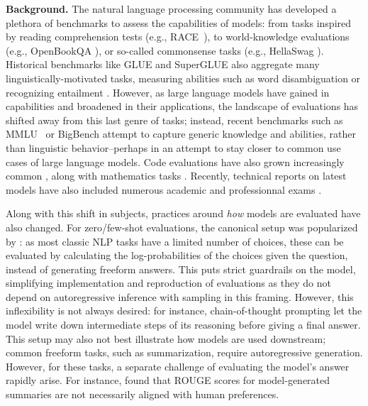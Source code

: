 \documentclass{article}
\begin{document}
\textbf{Background.} The natural language processing community has developed a plethora of benchmarks to assess the capabilities of models: from tasks inspired by reading comprehension tests (e.g., RACE~\citet{lai2017large}), to world-knowledge evaluations (e.g., OpenBookQA \citet{mihaylov2press2021train018openbookqa}), or so-called commonsense tasks (e.g., HellaSwag \citep{zellers2019hellaswag}). Historical benchmarks like GLUE and SuperGLUE also aggregate many linguistically-motivated tasks, measuring abilities such as word disambiguation or recognizing entailment \citep{wang2018glue, wang2019superglue}. However, as large language models have gained in capabilities and broadened in their applications, the landscape of evaluations has shifted away from this last genre of tasks; instead, recent benchmarks such as MMLU~\citep{hendrycks2020measuring} or BigBench \citep{srivastava2023beyond} attempt to capture generic knowledge and abilities, rather than linguistic behavior--perhaps in an attempt to stay closer to common use cases of large language models. Code evaluations have also grown increasingly common \citep{chen2021evaluating}, along with mathematics tasks \citep{cobbe2021training}. Recently, technical reports on latest models have also included numerous academic and professionnal exams \citep{gpt-4, palm-2}.

Along with this shift in subjects, practices around \textit{how} models are evaluated have also changed. For zero/few-shot evaluations, the canonical setup was popularized by \citet{brown2020gpt3}: as most classic NLP tasks have a limited number of choices, these can be evaluated by calculating the log-probabilities of the choices given the question, instead of generating freeform answers. This puts strict guardrails on the model, simplifying implementation and reproduction of evaluations as they do not depend on autoregressive inference with sampling in this framing. However, this inflexibility is not always desired: for instance, chain-of-thought prompting \citep{wei2022chain} let the model write down intermediate steps of its reasoning before giving a final answer. This setup may also not best illustrate how models are used downstream; common freeform tasks, such as summarization, require autoregressive generation. However, for these tasks, a separate challenge of evaluating the model's answer rapidly arise. For instance, \citet{stiennon2020learning} found that ROUGE scores for model-generated summaries are not necessarily aligned with human preferences.  
\end{document}

